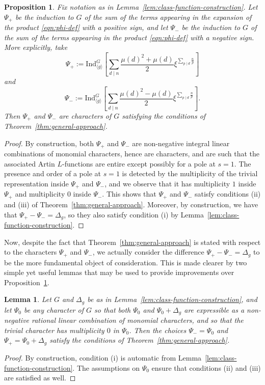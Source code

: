 \documentclass[12pt]{amsart}
\newtheorem{lemma}[theorem]{Lemma}
\newtheorem{proposition}[theorem]{Proposition}
\theoremstyle{definition} \newtheorem{definition}[theorem]{Definition}
\theoremstyle{example} \newtheorem{example}[theorem]{Example}
\theoremstyle{remark} \newtheorem{remark}{Remark}[theorem]
\numberwithin{equation}{section}
\numberwithin{theorem}{section}
\begin{document}
	\begin{proposition} \label{prop:first-construction}
		Fix notation as in Lemma~\ref{lem:class-function-construction}.  Let $\Psi_+$ be the induction to $G$ of the sum of the terms appearing in the expansion of the product \eqref{eqn:phi-def} with a positive sign, and let $\Psi_-$ be the induction to $G$ of the sum of the terms appearing in the product \eqref{eqn:phi-def} with a negative sign.  More explicitly, take
			\[
				\Psi_+ := \mathrm{Ind}_{\langle g\rangle}^G \left[ \sum_{d \mid n} \frac{\mu(d)^2 + \mu(d)}{2} \xi^{\sum_{p \mid d} \frac{n}{p}} \right]
			\]
		and
			\[
				\Psi_- := \mathrm{Ind}_{\langle g\rangle}^G \left[ \sum_{d \mid n} \frac{\mu(d)^2 - \mu(d)}{2} \xi^{\sum_{p \mid d} \frac{n}{p}} \right].
			\]
		Then $\Psi_+$ and $\Psi_-$ are characters of $G$ satisfying the conditions of Theorem~\ref{thm:general-approach}.
	\end{proposition}
	\begin{proof}
		By construction, both $\Psi_+$ and $\Psi_-$ are non-negative integral linear combinations of monomial characters, hence are characters, and are such that the associated Artin $L$-functions are entire except possibly for a pole at $s=1$.  The presence and order of a pole at $s=1$ is detected by the multiplicity of the trivial representation inside $\Psi_+$ and $\Psi_-$, and we observe that it has multiplicity $1$ inside $\Psi_+$ and multiplicity $0$ inside $\Psi_-$.  This shows that $\Psi_+$ and $\Psi_-$ satisfy conditions (ii) and (iii) of Theorem~\ref{thm:general-approach}.  Moreover, by construction, we have that $\Psi_+ - \Psi_- = \Delta_g$, so they also satisfy condition (i) by Lemma~\ref{lem:class-function-construction}.
	\end{proof}

	Now, despite the fact that Theorem~\ref{thm:general-approach} is stated with respect to the characters $\Psi_+$ and $\Psi_-$, we actually consider the difference $\Psi_+ - \Psi_- = \Delta_g$ to be the more fundamental object of consideration.  
	This is made clearer by two simple yet useful lemmas that may be used to provide improvements over Proposition~\ref{prop:first-construction}.
	
	
	\begin{lemma} \label{lem:class-functions-basepoint}
		Let $G$ and $\Delta_g$ be as in Lemma~\ref{lem:class-function-construction}, and let $\Psi_0$ be any character of $G$ so that both $\Psi_0$ and $\Psi_0 + \Delta_g$ are expressible as a non-negative rational linear combination of monomial characters, and so that the trivial character has multiplicity $0$ in $\Psi_0$.  Then the choices $\Psi_- = \Psi_0$ and $\Psi_+ = \Psi_0 + \Delta_g$ satisfy the conditions of Theorem~\ref{thm:general-approach}.
	\end{lemma}
	\begin{proof}
		By construction, condition (i) is automatic from Lemma~\ref{lem:class-function-construction}.  The assumptions on $\Psi_0$ ensure that conditions (ii) and (iii) are satisfied as well.
	\end{proof}
	
\end{document}
